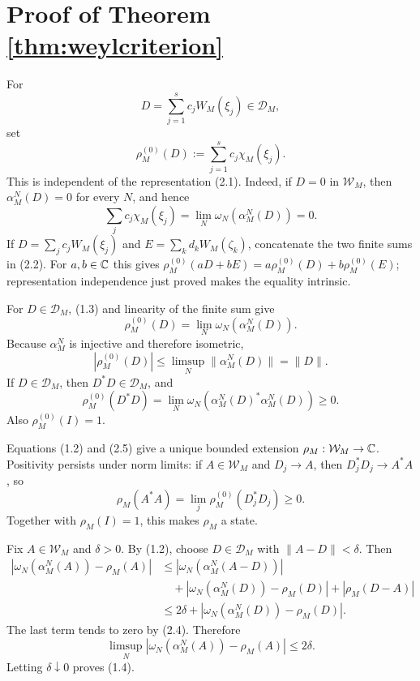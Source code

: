 \documentclass[11pt,a4paper]{article}
\newcommand{\W}{\mathcal W}
\begin{document}
\section{Proof of Theorem \ref{thm:weylcriterion}}


For
\[
 D=\sum_{j=1}^s c_jW_M(\xi_j)\in\mathcal D_M,                  \tag{2.1}
\]
set
\[
 \rho_M^{(0)}(D):=\sum_{j=1}^sc_j\chi_M(\xi_j).                \tag{2.2}
\]
This is independent of the representation (2.1).  Indeed, if \(D=0\) in
\(\W_M\), then \(\alpha_M^N(D)=0\) for every \(N\), and hence
\[
 \sum_jc_j\chi_M(\xi_j)
 =\lim_N\omega_N(\alpha_M^N(D))=0.                             \tag{2.3}
\]
If $D=\sum_jc_jW_M(\xi_j)$ and $E=\sum_kd_kW_M(\zeta_k)$, concatenate the two
finite sums in (2.2).  For $a,b\in\mathbb C$ this gives
$\rho_M^{(0)}(aD+bE)=a\rho_M^{(0)}(D)+b\rho_M^{(0)}(E)$; representation
independence just proved makes the equality intrinsic.


For \(D\in\mathcal D_M\), (1.3) and linearity of the finite sum give
\[
 \rho_M^{(0)}(D)=\lim_N\omega_N(\alpha_M^N(D)).                 \tag{2.4}
\]
Because \(\alpha_M^N\) is injective and therefore isometric,
\[
 |\rho_M^{(0)}(D)|
 \le\limsup_N\|\alpha_M^N(D)\|=\|D\|.                          \tag{2.5}
\]
If \(D\in\mathcal D_M\), then \(D^*D\in\mathcal D_M\), and
\[
 \rho_M^{(0)}(D^*D)
 =\lim_N\omega_N(\alpha_M^N(D)^*\alpha_M^N(D))\ge0.            \tag{2.6}
\]
Also \(\rho_M^{(0)}(I)=1\).


Equations (1.2) and (2.5) give a unique bounded extension
\(\rho_M:\W_M\to\C\).  Positivity persists under norm limits: if
\(A\in\W_M\) and \(D_j\to A\), then \(D_j^*D_j\to A^*A\), so
\[
 \rho_M(A^*A)=\lim_j\rho_M^{(0)}(D_j^*D_j)\ge0.                \tag{2.7}
\]
Together with \(\rho_M(I)=1\), this makes \(\rho_M\) a state.


Fix \(A\in\W_M\) and \(\delta>0\).  By (1.2), choose
\(D\in\mathcal D_M\) with \(\|A-D\|<\delta\).  Then
\begin{align}
 |\omega_N(\alpha_M^N(A))-\rho_M(A)|
 &\le|\omega_N(\alpha_M^N(A-D))|\\
 &\quad+|\omega_N(\alpha_M^N(D))-\rho_M(D)|
       +|\rho_M(D-A)|\\
 &\le2\delta+
 |\omega_N(\alpha_M^N(D))-\rho_M(D)|.                          \tag{2.8}
\end{align}
The last term tends to zero by (2.4).  Therefore
\[
 \limsup_N|\omega_N(\alpha_M^N(A))-\rho_M(A)|\le2\delta.       \tag{2.9}
\]
Letting \(\delta\downarrow0\) proves (1.4).
\end{document}
